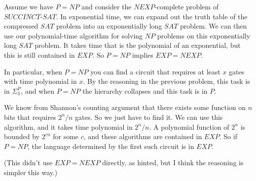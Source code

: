 \documentclass{article}
\newenvironment{problem}[2][Problem]{\begin{trivlist}
\item[\hskip \labelsep {\bfseries #1}\hskip \labelsep {\bfseries #2.}]}{\end{trivlist}}
\begin{document}
\begin{problem}{5}
  Assume we have $P = NP$ and consider the $NEXP$-complete problem of
  $SUCCINCT$-$SAT$. In exponential time, we can expand out the
  truth table of the compressed $SAT$ problem into an exponentially
  long $SAT$ problem. We can then use our polynomial-time algorithm
  for solving $NP$ problems on this exponentially long $SAT$
  problem. It takes time that is the polynomial of an exponential, but
  this is still contained in $EXP$. So $P = NP$ implies $EXP = NEXP$.

  In particular, when $P = NP$ you can find a circuit that requires at
  least $x$ gates with time polynomial in $x$. By the reasoning in the
  previous problem, this task is in $\Sigma_3^P$, and when $P = NP$
  the hierarchy collapses and this task is in $P$.

  We know from Shannon's counting argument that there exists some function on
  $n$ bits that requires $2^n / n$ gates. So we just have to find
  it. We can use this algorithm, and it takes time polynomial in $2^n / n$.
  A polynomial function of $2^n$ is bounded by $2^{cn}$ for some $c$, and
  these algorithms are contained in $EXP$. So if $P = NP$, the 
  language determined by the first such circuit is in $EXP$.

  (This didn't use $EXP = NEXP$ directly, as hinted, but I think the reasoning is
  simpler this way.)
\end{problem}
\end{document}
